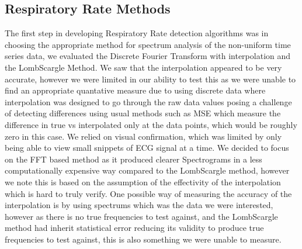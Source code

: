 \subsection{Respiratory Rate Methods}
The first step in developing Respiratory Rate detection algorithms was in choosing the appropriate method
for spectrum analysis of the non-uniform time series data, we evaluated the Discrete Fourier Transform with interpolation and the LombScargle
Method. 
We saw that the interpolation appeared to be very accurate, however  we were limited in our ability 
to test this as we were unable to find an appropriate quantative measure due to using discrete data where interpolation was designed 
to go through the raw data values posing a challenge of detecting differences using usual methods such as MSE which measure the difference in 
true vs interpolated only at the data points, which would be roughly zero in this case. We relied on visual confirmation, which was limited by only being able to view 
 small snippets of ECG signal at a time. We decided to focus on the FFT based method as it produced clearer Spectrograms in a less computationally expensive way compared 
 to the LombScargle method, however 
we note this is based on the assumption of the effectivity of the interpolation which is hard to truly verify. One possible way of measuring the accuracy
of the interpolation is by using spectrums which was the data we were interested, however as there is no true frequencies to test against, and the LombScargle method 
had inherit statistical error reducing its validity to produce true frequencies to test against, this is also something we were unable to measure. \\

